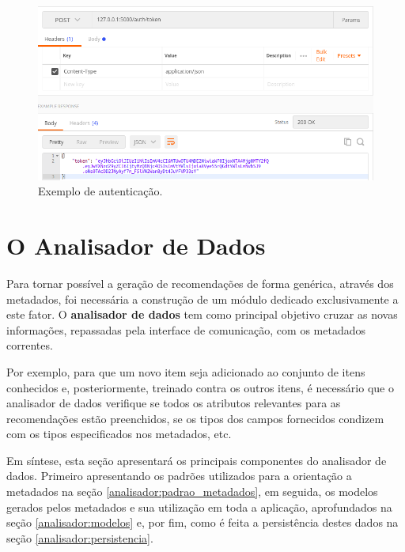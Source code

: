 \documentclass[12pt, openright, oneside, a4paper, brazil]{abntex2}
\begin{document}
\begin{figure}[h!tp]

	\caption{\label{auth_example}Exemplo de autenticação.}

	\begin{center}
		\includegraphics[scale=0.6]{images/auth_example.png}

	\end{center}

	\hspace{5.5cm}{Fonte: O Autor.}

\end{figure}

\section{O Analisador de Dados} \label{analisador}

Para tornar possível a geração de recomendações de forma genérica, através dos metadados, foi necessária a construção de um módulo dedicado exclusivamente a este fator. O \textbf{analisador de dados} tem como principal objetivo cruzar as novas informações, repassadas pela interface de comunicação, com os metadados correntes.

Por exemplo, para que um novo item seja adicionado ao conjunto de itens conhecidos e, posteriormente, treinado contra os outros itens, é necessário que o analisador de dados verifique se todos os atributos relevantes para as recomendações estão preenchidos, se os tipos dos campos fornecidos condizem com os tipos especificados nos metadados, etc. 

Em síntese, esta seção apresentará os principais componentes do analisador de dados. Primeiro apresentando os padrões utilizados para a orientação a metadados na seção \ref{analisador:padrao_metadados}, em seguida, os modelos gerados pelos metadados e sua utilização em toda a aplicação, aprofundados na seção \ref{analisador:modelos} e, por fim, como é feita a persistência destes dados na seção \ref{analisador:persistencia}.
\end{document}
